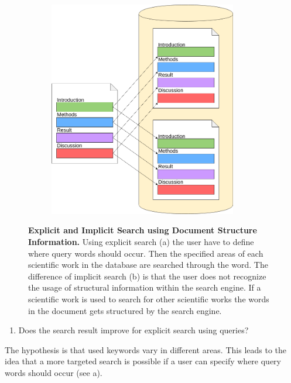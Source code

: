 \begin{figure}[t]
\begin{subfigure}[c]{0.49\textwidth}
    \includegraphics[width=0.9\textwidth]{figures/implicit}
  \end{subfigure}
  \caption[Explicit and Implicit Search using Document Structure Information]{\textbf{Explicit and Implicit Search using Document Structure Information.} Using explicit search (a) the user have to define where query words should occur. Then the specified areas of each scientific work in the database are searched through the word. The difference of implicit search (b) is that the user does not recognize the usage of structural information within the search engine. If a scientific work is used to search for other scientific works the words in the document gets structured by the search engine.}
  \label{fig:implicit_vs_explicit}
\end{figure}

\begin{enumerate}
  \item Does the search result improve for explicit search using queries?
\end{enumerate}

The hypothesis is that used keywords vary in different areas. This leads to the idea that a more targeted search is possible if a user can specify where query words should occur (see  a).

